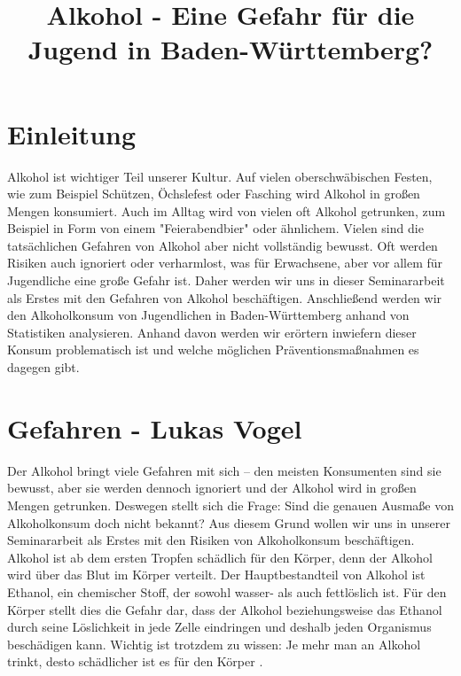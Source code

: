 \documentclass[12pt]{article}
\title{Alkohol - Eine Gefahr für die Jugend in Baden-Württemberg?}
\begin{document}


\clearpage
\tableofcontents
{}
\setcounter{page}{1}
\clearpage


\section{Einleitung}
Alkohol ist wichtiger Teil unserer Kultur. Auf vielen oberschwäbischen Festen, wie zum Beispiel Schützen, Öchslefest oder Fasching wird Alkohol in großen Mengen konsumiert. Auch im Alltag wird von vielen oft Alkohol getrunken, zum Beispiel in Form von einem "Feierabendbier" oder ähnlichem. Vielen sind die tatsächlichen Gefahren von Alkohol aber nicht vollständig bewusst. Oft werden Risiken auch ignoriert oder verharmlost, was für Erwachsene, aber vor allem für Jugendliche eine große Gefahr ist. Daher werden wir uns in dieser Seminararbeit als Erstes mit den Gefahren von Alkohol beschäftigen. Anschließend werden wir den Alkoholkonsum von Jugendlichen in Baden-Württemberg anhand von Statistiken analysieren. Anhand davon werden wir erörtern inwiefern dieser Konsum problematisch ist und welche möglichen Präventionsmaßnahmen es dagegen gibt.
\section{Gefahren \footnotesize{- Lukas Vogel}} %
Der Alkohol bringt viele Gefahren mit sich – den meisten Konsumenten sind sie bewusst, aber sie werden dennoch ignoriert und der Alkohol wird in großen Mengen getrunken. 
Deswegen stellt sich die Frage: Sind die genauen Ausmaße von Alkoholkonsum doch nicht bekannt? 
Aus diesem Grund wollen wir uns in unserer Seminararbeit als Erstes mit den Risiken von Alkoholkonsum beschäftigen.%
Alkohol ist ab dem ersten Tropfen schädlich für den Körper, denn der Alkohol wird über das Blut im Körper verteilt. Der Hauptbestandteil von Alkohol ist Ethanol, ein chemischer Stoff, der sowohl wasser- als auch fettlöslich ist. Für den Körper stellt dies die Gefahr dar, dass der Alkohol beziehungsweise das Ethanol durch seine Löslichkeit in jede Zelle eindringen und deshalb jeden Organismus beschädigen kann. Wichtig ist trotzdem zu wissen: Je mehr man an Alkohol trinkt, desto schädlicher ist es für den Körper \autocite{burger_bundes-gesundheitssurvey_2003}.\\
\end{document}

